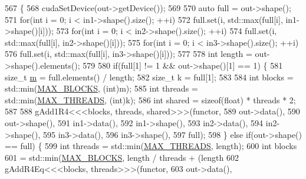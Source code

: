 \begin{DoxyCode}
567                                                                           \{
568   cudaSetDevice(out->getDevice());
569 
570   \textcolor{keyword}{auto} full = out->shape();
571   \textcolor{keywordflow}{for}(\textcolor{keywordtype}{int} i = 0; i < in1->shape().size(); ++i)
572     full.set(i, std::max(full[i], in1->shape()[i]));
573   \textcolor{keywordflow}{for}(\textcolor{keywordtype}{int} i = 0; i < in2->shape().size(); ++i)
574     full.set(i, std::max(full[i], in2->shape()[i]));
575   \textcolor{keywordflow}{for}(\textcolor{keywordtype}{int} i = 0; i < in3->shape().size(); ++i)
576     full.set(i, std::max(full[i], in3->shape()[i]));
577 
578   \textcolor{keywordtype}{int} length = out->shape().elements();
579 
580   \textcolor{keywordflow}{if}(full[1] != 1 && out->shape()[1] == 1) \{
581     \textcolor{keywordtype}{size\_t} \hyperlink{namespacefix__hard_aeddecc2eb0c9f49a568cb1bf69ac50f5}{m} = full.elements() / length;
582     \textcolor{keywordtype}{size\_t} k = full[1];
583 
584     \textcolor{keywordtype}{int} blocks = std::min(\hyperlink{matrix__functions_8h_aba7f789f3266685ad8840806656e3692}{MAX\_BLOCKS}, (\textcolor{keywordtype}{int})m);
585     \textcolor{keywordtype}{int} threads = std::min(\hyperlink{matrix__functions_8h_a8b5173357adb02a86c027316e0acdfa0}{MAX\_THREADS}, (\textcolor{keywordtype}{int})k);
586     \textcolor{keywordtype}{int} shared = \textcolor{keyword}{sizeof}(float) * threads * 2;
587 
588     gAdd1R4<<<blocks, threads, shared>>>(functor,
589                                          out->data(),
590                                          out->shape(),
591                                          in1->data(),
592                                          in1->shape(),
593                                          in2->data(),
594                                          in2->shape(),
595                                          in3->data(),
596                                          in3->shape(),
597                                          full);
598   \} \textcolor{keywordflow}{else} \textcolor{keywordflow}{if}(out->shape() == full) \{
599     \textcolor{keywordtype}{int} threads = std::min(\hyperlink{matrix__functions_8h_a8b5173357adb02a86c027316e0acdfa0}{MAX\_THREADS}, length);
600     \textcolor{keywordtype}{int} blocks
601         = std::min(\hyperlink{matrix__functions_8h_aba7f789f3266685ad8840806656e3692}{MAX\_BLOCKS}, length / threads + (length %
602     gAddR4Eq<<<blocks, threads>>>(functor,
603                                   out->data(),

\end{DoxyCode}
